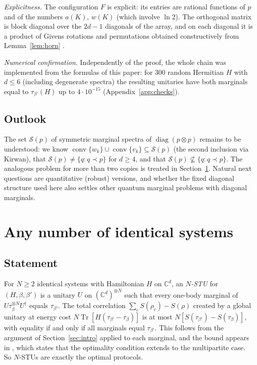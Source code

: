 \documentclass[11pt]{amsart}
\theoremstyle{definition}
\theoremstyle{remark}
\numberwithin{equation}{section}
\newcommand{\C}{\mathbb{C}}
\newcommand{\Tr}{\operatorname{Tr}}
\newcommand{\diag}{\operatorname{diag}}
\newcommand{\conv}{\operatorname{conv}}
\begin{document}
\emph{Explicitness.} The configuration $F$ is explicit: its entries are rational functions of $p$ and
of the numbers $a(K)$, $w(K)$ (which involve $\ln 2$). The orthogonal matrix is block diagonal over the
$2d-1$ diagonals of the array, and on each diagonal it is a product of Givens rotations and permutations
obtained constructively from Lemma~\ref{lem:horn} \cite{ChanLi1983}.

\emph{Numerical confirmation.} Independently of the proof, the whole chain was implemented from the
formulas of this paper: for $300$ random Hermitian $H$ with $d\le6$ (including degenerate spectra) the
resulting unitaries have both marginals equal to $\tau_{\beta'}(H)$ up to $4\cdot10^{-15}$
(Appendix~\ref{app:checks}).

\subsection{Outlook}
The set $\mathcal S(p)$ of symmetric marginal spectra of $\diag(p\otimes p)$ remains to be understood: we
know $\conv\{w_k\}\cup\conv\{v_k\}\subseteq\mathcal S(p)$ (the second inclusion via Kirwan), that
$\mathcal S(p)\ne\{q:q\prec p\}$ for $d\ge4$, and that $\mathcal S(p)\not\subseteq\{q:q\prec p\}$. The analogous
problem for more than two copies is treated in Section~\ref{sec:nparty}. Natural next questions are
quantitative (robust) versions, and
whether the fixed diagonal structure used here also settles other quantum marginal problems with
diagonal marginals.


\section{Any number of identical systems}\label{sec:nparty}

\subsection{Statement}
For $N\ge2$ identical systems with Hamiltonian $H$ on $\C^d$, an \emph{$N$-STU} for $(H,\beta,\beta')$ is a unitary $U$
on $(\C^d)^{\otimes N}$ such that every one-body marginal of $U\tau_\beta^{\otimes N}U^\dagger$ equals $\tau_{\beta'}$.
The total correlation $\sum_cS(\rho_c)-S(\rho)$ created by a global unitary at energy cost
$N\Tr[H(\tau_{\beta'}-\tau_\beta)]$ is at most $N[S(\tau_{\beta'})-S(\tau_\beta)]$, with equality if and only if all
marginals equal $\tau_{\beta'}$. This follows from the argument of Section~\ref{sec:intro} applied to each marginal,
and the bound appears in \cite{HuberEtAl2015}, which states that the optimality condition extends to the multipartite
case. So $N$-STUs are exactly the optimal protocols.
\end{document}
